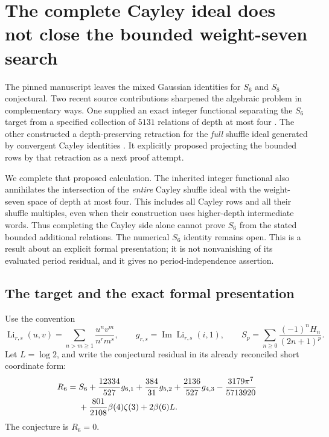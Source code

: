 \documentclass[11pt,a4paper]{article}
\numberwithin{equation}{section}
\theoremstyle{definition}
\theoremstyle{remark}
\providecommand{\shuffle}{\mathbin{\amalg}}
\begin{document}


\providecommand{\shuffle}{\mathbin{\amalg}}
\section{The complete Cayley ideal does not close the bounded weight-seven search}
\label{gf:sec}

The pinned manuscript leaves the mixed Gaussian identities for $S_6$ and
$S_8$ conjectural. Two recent source contributions sharpened the algebraic
problem in complementary ways. One supplied an exact integer functional
separating the $S_6$ target from a specified collection of $5131$ relations
of depth at most four \cite{gf:Bounded}. The other constructed a
depth-preserving retraction for the \emph{full} shuffle ideal generated by
convergent Cayley identities \cite{gf:Depth}. It explicitly proposed
projecting the bounded rows by that retraction as a next proof attempt.

We complete that proposed calculation. The inherited integer functional
also annihilates the intersection of the \emph{entire} Cayley shuffle ideal
with the weight-seven space of depth at most four. This includes all
Cayley rows and all their shuffle multiples, even when their construction
uses higher-depth intermediate words. Thus completing the Cayley side
alone cannot prove $S_6$ from the stated bounded additional relations.
The numerical $S_6$ identity remains open. This is a result about an
explicit formal presentation; it is not nonvanishing of its evaluated
period residual, and it gives no period-independence assertion.

\subsection{The target and the exact formal presentation}

Use the convention
\[
 \operatorname{Li}_{r,s}(u,v)=\sum_{n>m\geq1}\frac{u^n v^m}{n^r m^s},
 \qquad g_{r,s}=\operatorname{Im}\operatorname{Li}_{r,s}(i,1),
 \qquad S_p=\sum_{n\geq0}\frac{(-1)^nH_n}{(2n+1)^p}.
\]
Let $L=\log2$, and write the conjectural residual in its already reconciled
short coordinate form:
\begin{align}
 R_6={}&S_6+\frac{12334}{527}g_{6,1}+\frac{384}{31}g_{5,2}
       +\frac{2136}{527}g_{4,3}-\frac{3179\pi^7}{5713920}\notag\\
      &+\frac{801}{2108}\beta(4)\zeta(3)+2\beta(6)L.
 \label{gf:eq:residual}
\end{align}
The conjecture is $R_6=0$.
\end{document}
